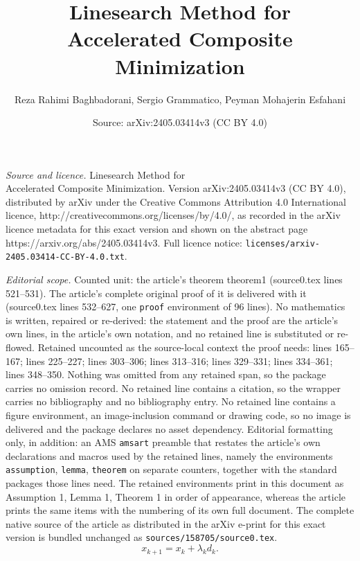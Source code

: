 \documentclass[10pt,a4paper]{amsart}
\title{Linesearch Method for \\ Accelerated Composite Minimization}
\author{Reza Rahimi Baghbadorani, Sergio Grammatico, Peyman Mohajerin Esfahani}
\date{Source: arXiv:2405.03414v3 (CC BY 4.0)}
\begin{document}
\maketitle

\noindent\emph{Source and licence.} Linesearch Method for \\ Accelerated Composite Minimization. Version arXiv:2405.03414v3 (CC BY 4.0), distributed by arXiv under the Creative Commons Attribution 4.0 International licence, http://creativecommons.org/licenses/by/4.0/, as recorded in the arXiv licence metadata for this exact version and shown on the abstract page https://arxiv.org/abs/2405.03414v3. Full licence notice: \texttt{licenses/arxiv-2405.03414-CC-BY-4.0.txt}.\par\smallskip

\noindent\textit{Editorial scope.} Counted unit: the article's theorem theorem1 (source0.tex lines 521--531). The article's complete original proof of it is delivered with it (source0.tex lines 532--627, one \texttt{proof} environment of 96 lines). No mathematics is written, repaired or re-derived: the statement and the proof are the article's own lines, in the article's own notation, and no retained line is substituted or re-flowed.  Retained uncounted as the source-local context the proof needs: lines 165--167; lines 225--227; lines 303--306; lines 313--316; lines 329--331; lines 334--361; lines 348--350.  Nothing was omitted from any retained span, so the package carries no omission record.  No retained line contains a citation, so the wrapper carries no bibliography and no bibliography entry.  No retained line contains a figure environment, an image-inclusion command or drawing code, so no image is delivered and the package declares no asset dependency.  Editorial formatting only, in addition: an AMS \texttt{amsart} preamble that restates the article's own declarations and macros used by the retained lines, namely the environments \texttt{assumption}, \texttt{lemma}, \texttt{theorem} on separate counters, together with the standard packages those lines need.  The retained environments print in this document as Assumption 1, Lemma 1, Theorem 1 in order of appearance, whereas the article prints the same items with the numbering of its own full document.  The complete native source of the article as distributed in the arXiv e-print for this exact version is bundled unchanged as \texttt{sources/158705/source0.tex}.
\begin{equation}\label{stepsize-search direction}
    x_{k+1} = x_k + \lambda_k d_k. %
\end{equation}
\end{document}
